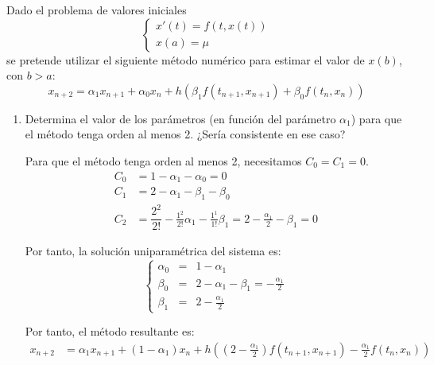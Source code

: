 \begin{ejercicio}
    Dado el problema de valores iniciales
    \begin{equation*}
        \begin{cases}
            x'(t) = f(t, x(t)) \\
            x(a) = \mu
        \end{cases}
    \end{equation*}
    se pretende utilizar el siguiente método numérico para estimar el valor de $x(b)$, con $b > a$:
    \begin{equation*}
        x_{n+2} = \alpha_1 x_{n+1} + \alpha_0 x_n + h \left( \beta_1 f(t_{n+1}, x_{n+1}) + \beta_0 f(t_n, x_n) \right)
    \end{equation*}
    \begin{enumerate}
        \item Determina el valor de los parámetros (en función del parámetro $\alpha_1$) para que el método tenga orden al menos 2. ¿Sería consistente en ese caso?
        
        Para que el método tenga orden al menos 2, necesitamos $C_0=C_1=0$.
        \begin{align*}
            C_0 &= 1 - \alpha_1 - \alpha_0 = 0 \\
            C_1 &= 2 - \alpha_1 - \beta_1 - \beta_0\\
            C_2 &= \dfrac{2^2}{2!} - \frac{1^2}{2!}\alpha_1 - \frac{1^1}{1!}\beta_1 = 2 - \frac{\alpha_1}{2} - \beta_1 = 0
        \end{align*}

        Por tanto, la solución uniparamétrica del sistema es:
        \begin{equation*}
            \left\{\begin{array}{rcl}
                \alpha_0 & = & 1 - \alpha_1 \\
                \beta_0 & = & 2 - \alpha_1 - \beta_1 = -\frac{\alpha_1}{2} \\
                \beta_1 & = & 2 - \frac{\alpha_1}{2}
            \end{array}\right.
        \end{equation*}

        Por tanto, el método resultante es:
        \begin{align*}
            x_{n+2} &= \alpha_1 x_{n+1} + (1 - \alpha_1) x_n + h \left( \left(2 - \frac{\alpha_1}{2}\right) f(t_{n+1}, x_{n+1}) - \frac{\alpha_1}{2} f(t_n, x_n) \right)
        \end{align*}


\end{enumerate}
\end{ejercicio}
